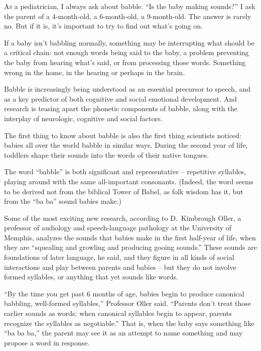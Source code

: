 ﻿\documentclass[12pt]{article}
\begin{document}
\lettrine{A}{s} a pediatrician, I always ask about babble. ``Is the baby
making sounds?'' I ask the parent of a 4-month-old, a 6-month-old, a 9-month-old. The answer is
rarely no. But if it is, it's important to try to find out what's going on.

If a baby isn't babbling normally, something may be interrupting what should be a critical chain:
not enough words being said to the baby, a problem preventing the baby from hearing what's said, or
from processing those words. Something wrong in the home, in the hearing or perhaps in the brain.

Babble is increasingly being understood as an essential precursor to speech, and as a key predictor
of both cognitive and social emotional development. And research is teasing apart the phonetic
components of babble, along with the interplay of neurologic, cognitive and social factors.

The first thing to know about babble is also the first thing scientists noticed: babies all over the
world babble in similar ways. During the second year of life, toddlers shape their sounds into the
words of their native tongues.

The word ``babble'' is both significant and representative -- repetitive syllables, playing around
with the same all-important consonants. (Indeed, the word seems to be derived not from the biblical
Tower of Babel, as folk wisdom has it, but from the ``ba ba'' sound babies make.)

Some of the most exciting new research, according to D.~Kimbrough Oller, a professor of audiology
and speech-language pathology at the University of Memphis, analyzes the sounds that babies make in
the first half-year of life, when they are ``squealing and growling and producing gooing sounds.''
These sounds are foundations of later language, he said, and they figure in all kinds of social
interactions and play between parents and babies -- but they do not involve formed syllables, or
anything that yet sounds like words.

``By the time you get past 6 months of age, babies begin to produce canonical babbling, well-formed
syllables,'' Professor Oller said. ``Parents don't treat those earlier sounds as words; when
canonical syllables begin to appear, parents recognize the syllables as negotiable.'' That is, when
the baby says something like ``ba ba ba,'' the parent may see it as an attempt to name something and
may propose a word in response.
\end{document}

